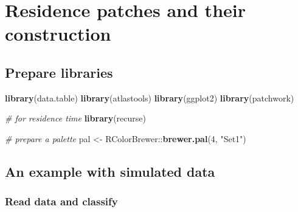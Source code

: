 \documentclass[
]{scrreprt}
\newenvironment{Shaded}{}{}
\newcommand{\CommentTok}[1]{\textcolor[rgb]{0.38,0.63,0.69}{\textit{#1}}}
\newcommand{\DataTypeTok}[1]{\textcolor[rgb]{0.56,0.13,0.00}{#1}}
\newcommand{\DecValTok}[1]{\textcolor[rgb]{0.25,0.63,0.44}{#1}}
\newcommand{\ErrorTok}[1]{\textcolor[rgb]{1.00,0.00,0.00}{\textbf{#1}}}
\newcommand{\KeywordTok}[1]{\textcolor[rgb]{0.00,0.44,0.13}{\textbf{#1}}}
\newcommand{\NormalTok}[1]{#1}
\newcommand{\OperatorTok}[1]{\textcolor[rgb]{0.40,0.40,0.40}{#1}}
\newcommand{\StringTok}[1]{\textcolor[rgb]{0.25,0.44,0.63}{#1}}
\begin{document}
\hypertarget{residence-patches-and-their-construction}{%
\chapter{Residence patches and their construction}\label{residence-patches-and-their-construction}}

\hypertarget{prepare-libraries}{%
\section*{Prepare libraries}\label{prepare-libraries}}

\begin{Shaded}
\begin{Highlighting}[]
\KeywordTok{library}\NormalTok{(data.table)}
\KeywordTok{library}\NormalTok{(atlastools)}
\KeywordTok{library}\NormalTok{(ggplot2)}
\KeywordTok{library}\NormalTok{(patchwork)}

\CommentTok{\# for residence time}
\KeywordTok{library}\NormalTok{(recurse)}

\CommentTok{\# prepare a palette}
\NormalTok{pal <{-}}\StringTok{ }\NormalTok{RColorBrewer}\OperatorTok{::}\KeywordTok{brewer.pal}\NormalTok{(}\DecValTok{4}\NormalTok{, }\StringTok{"Set1"}\NormalTok{)}
\end{Highlighting}
\end{Shaded}

\hypertarget{an-example-with-simulated-data}{%
\section{An example with simulated data}\label{an-example-with-simulated-data}}

\hypertarget{read-data-and-classify}{%
\subsection{Read data and classify}\label{read-data-and-classify}}

\begin{Shaded}
\end{Shaded}
\end{document}
